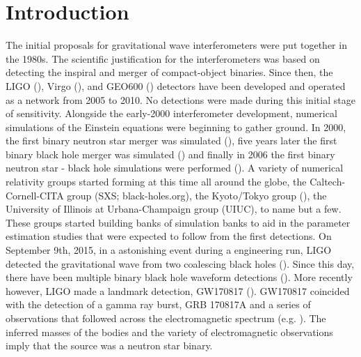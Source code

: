 
\chapter{Introduction}
\label{chap:intro}

The initial proposals for gravitational wave interferometers were
put together in the 1980s. The scientific justification for the interferometers was based on detecting the inspiral and merger of compact-object binaries. Since then, the LIGO (\cite{ligo2018gwtc}), Virgo (\cite{acernese2015advanced}), and GEO600 (\cite{affeldt2014advanced}) detectors have been developed and operated as a network from 2005 to 2010. No detections were made during this initial stage of sensitivity. Alongside the early-2000 interferometer development, numerical simulations of the Einstein equations were beginning to gather ground. In 2000, the first binary neutron star merger was simulated (\cite{shibata2000simulation}), five years later the first binary black hole merger was simulated (\cite{pretorius2005a}) and finally in 2006 the first binary neutron star - black hole simulations were performed (\cite{shibata2006merger}). A variety of numerical relativity groups started forming at this time all around the globe, the Caltech-Cornell-CITA group (SXS; black-holes.org),
the Kyoto/Tokyo group (\cite{nagakura:2014hza}), the University of Illinois at Urbana-Champaign group (UIUC), to name but a few. These groups started building banks of simulation banks to aid in the parameter estimation studies that were expected to follow from the first detections. On September 9th, 2015, in a astonishing event during a engineering run, LIGO detected the gravitational wave from two coalescing black holes (\cite{theligoscientific:2016wfe}). Since this day, there have been multiple binary black hole waveform detections (\cite{ligo2018gwtc}). More recently however, LIGO made a landmark detection, GW170817 (\cite{abbott2017gw170817}). GW170817
coincided with the detection of a gamma ray burst, GRB 170817A and a series of observations that followed across the electromagnetic spectrum (e.g. \cite{villar:2017wcc}). The inferred masses of the bodies and the variety of electromagnetic observations imply that the source was a neutron star binary.

